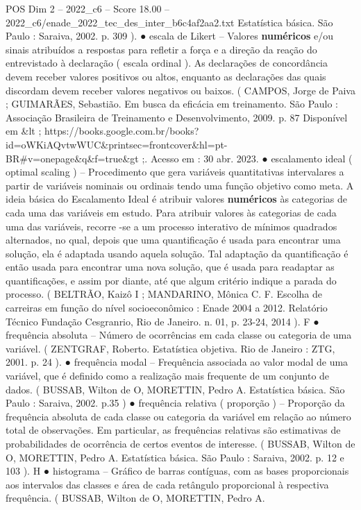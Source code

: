 \begin{textsample}{POS Dim 2 – 2022\_c6 – Score 18.00 – 2022\_c6/enade\_2022\_tec\_des\_inter\_b6c4af2aa2.txt}
Estatística básica.
São Paulo : Saraiva, 2002. p. 309 ). {\EmojiFont ●} escala de Likert – Valores \textbf{numéricos} e/ou sinais atribuídos a respostas para refletir a força e a direção da reação do entrevistado à declaração ( escala ordinal ).
As declarações de concordância devem receber valores positivos ou altos, enquanto as declarações das quais discordam devem receber valores negativos ou baixos. ( CAMPOS, Jorge de Paiva ; GUIMARÃES, Sebastião.
Em busca da eficácia em treinamento.
São Paulo : Associação Brasileira de Treinamento e Desenvolvimento, 2009. p. 87 Disponível em \&lt ; https://books.google.com.br/books? id=oWKiAQvtwWUC\&printsec=frontcover\&hl=pt-BR\#v=onepage\&q\&f=true\&gt ;.
Acesso em : 30 abr. 2023. {\EmojiFont ●} escalamento ideal ( optimal scaling ) – Procedimento que gera variáveis quantitativas intervalares a partir de variáveis nominais ou ordinais tendo uma função objetivo como meta.
A ideia básica do Escalamento Ideal é atribuir valores \textbf{numéricos} às categorias de cada uma das variáveis em estudo.
Para atribuir valores às categorias de cada uma das variáveis, recorre -se a um processo interativo de mínimos quadrados alternados, no qual, depois que uma quantificação é usada para encontrar uma solução, ela é adaptada usando aquela solução.
Tal adaptação da quantificação é então usada para encontrar uma nova solução, que é usada para readaptar as quantificações, e assim por diante, até que algum critério indique a parada do processo. ( BELTRÃO, Kaizô I ; MANDARINO, Mônica C.
F.
Escolha de carreiras em função do nível socioeconômico : Enade 2004 a 2012.
Relatório Técnico Fundação Cesgranrio, Rio de Janeiro. n. 01, p. 23-24, 2014 ).
F {\EmojiFont ●} frequência absoluta – Número de ocorrências em cada classe ou categoria de uma variável. ( ZENTGRAF, Roberto.
Estatística objetiva.
Rio de Janeiro : ZTG, 2001. p. 24 ). {\EmojiFont ●} frequência modal – Frequência associada ao valor modal de uma variável, que é definido como a realização mais frequente de um conjunto de dados. ( BUSSAB, Wilton de O, MORETTIN, Pedro A.
Estatística básica.
São Paulo : Saraiva, 2002. p.35 ) {\EmojiFont ●} frequência relativa ( proporção ) – Proporção da frequência absoluta de cada classe ou categoria da variável em relação ao número total de observações.
Em particular, as frequências relativas são estimativas de probabilidades de ocorrência de certos eventos de interesse. ( BUSSAB, Wilton de O, MORETTIN, Pedro A.
Estatística básica.
São Paulo : Saraiva, 2002. p. 12 e 103 ).
H {\EmojiFont ●} histograma – Gráfico de barras contíguas, com as bases proporcionais aos intervalos das classes e área de cada retângulo proporcional à respectiva frequência. ( BUSSAB, Wilton de O, MORETTIN, Pedro A.

\end{textsample}
